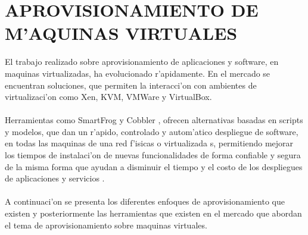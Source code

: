 \chapter{APROVISIONAMIENTO DE M'AQUINAS VIRTUALES}
\label{aprmaqvir}
El trabajo realizado sobre aprovisionamiento de aplicaciones y software, en maquinas virtualizadas, ha evolucionado r'apidamente. En el mercado se encuentran soluciones, que permiten la interacci'on con ambientes de virtualizaci'on como Xen, KVM, VMWare y VirtualBox.\\
\\
Herramientas como SmartFrog \cite{3} y Cobbler \cite{6} , ofrecen alternativas basadas en scripts y modelos, que dan un r'apido, controlado y autom'atico despliegue de software, en todas las maquinas de una red f'isicas o virtualizada s, permitiendo mejorar los tiempos de instalaci'on de nuevas funcionalidades de forma confiable y segura de la misma forma que ayudan a disminuir el tiempo y el costo de los despliegues de aplicaciones y servicios \cite{4}.\\
\\
A continuaci'on se presenta los diferentes enfoques de aprovisionamiento que existen y posteriormente las herramientas que existen en el mercado que abordan el tema de aprovisionamiento sobre maquinas virtuales.


